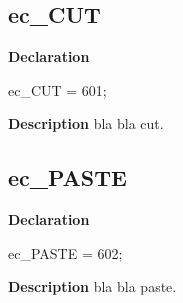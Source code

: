 \documentclass{report}
\newif\ifpdf
\begin{document}
\subsection*{ec{\_}CUT}
\fi
\label{ok_const_1st_comment_missing-ec_CUT}
\begin{list}{}{
\setlength{\itemindent}{0cm}
\setlength{\listparindent}{0cm}
\setlength{\leftmargin}{\evensidemargin}
\addtolength{\leftmargin}{\tmplength}
\settowidth{\labelsep}{X}
\addtolength{\leftmargin}{\labelsep}
\setlength{\labelwidth}{\tmplength}
}
\item[\textbf{Declaration}\hfill]
\ifpdf
\begin{flushleft}
\fi
\begin{ttfamily}
ec{\_}CUT            = 601;\end{ttfamily}

\ifpdf
\end{flushleft}
\fi

\par
\item[\textbf{Description}]
bla bla cut.

\end{list}
\ifpdf
\subsection*{\large{\textbf{ec{\_}PASTE}}\normalsize\hspace{1ex}\hrulefill}
\else
\subsection*{ec{\_}PASTE}
\fi
\label{ok_const_1st_comment_missing-ec_PASTE}
\begin{list}{}{
\setlength{\itemindent}{0cm}
\setlength{\listparindent}{0cm}
\setlength{\leftmargin}{\evensidemargin}
\addtolength{\leftmargin}{\tmplength}
\settowidth{\labelsep}{X}
\addtolength{\leftmargin}{\labelsep}
\setlength{\labelwidth}{\tmplength}
}
\item[\textbf{Declaration}\hfill]
\ifpdf
\begin{flushleft}
\fi
\begin{ttfamily}
ec{\_}PASTE          = 602;\end{ttfamily}

\ifpdf
\end{flushleft}
\fi

\par
\item[\textbf{Description}]
bla bla paste.

\end{list}
\end{document}
